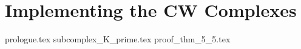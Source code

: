 \documentclass[class=article, crop=false]{standalone}
\begin{document}
\section{Implementing the CW Complexes}	

{prologue.tex}
{subcomplex_K_prime.tex}
{proof_thm_5_5.tex}
\end{document}
